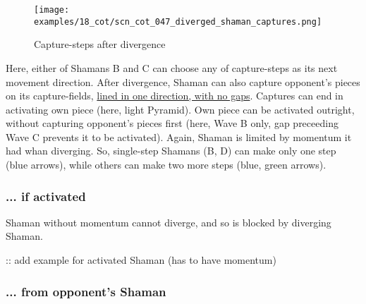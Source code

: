 \vspace*{-1.4\baselineskip}
\noindent
\begin{figure}[!h]
\texttt{[image: examples/18\_cot/scn\_cot\_047\_diverged\_shaman\_captures.png]}
\vspace*{-1.4\baselineskip}
\caption{Capture-steps after divergence}
\label{fig:scn_cot_047_diverged_shaman_captures}
\end{figure}

\vspace*{-0.4\baselineskip}
Here, either of Shamans B and C can choose any of capture-steps as its next movement direction.
After divergence, Shaman can also capture opponent's pieces on its capture-fields,
\hyperref[fig:scn_cot_004_light_shaman_capture_ply]{lined in one direction, with no gaps}.
Captures can end in activating own piece (here, light Pyramid). Own piece can
be activated outright, without capturing opponent's pieces first (here, Wave B only, gap
preceeding Wave C prevents it to be activated). \newline
\indent
Again, Shaman is limited by momentum it had whan diverging. So, single-step Shamans
(B, D) can make only one step (blue arrows), while others can make two more steps
(blue, green arrows).


\clearpage %

\subsubsection*{... if activated}
\label{sec:Conquest of Tlalocan/Divergence/... if activated}


Shaman without momentum cannot diverge, and so is blocked by diverging Shaman.

\vspace*{9.7\baselineskip}
\TODO :: add example for activated Shaman (has to have momentum)

\clearpage %

\subsubsection*{... from opponent's Shaman}
\label{sec:Conquest of Tlalocan/Divergence/... from opponent's Shaman}

